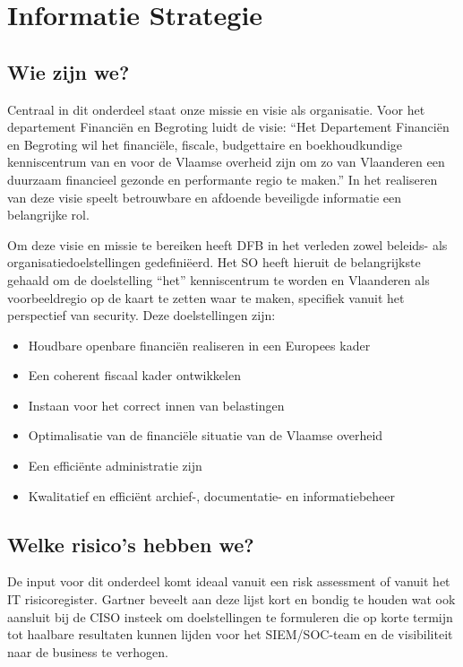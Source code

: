 \documentclass[11pt]{article}
\begin{document}
\section{Informatie Strategie}
\label{sec:orgeaf603a}
\subsection{Wie zijn we?}
\label{sec:orgb6dd55e}
Centraal in dit onderdeel staat onze missie en visie als organisatie. Voor het departement Financiën en Begroting luidt de visie: ``Het Departement Financiën en Begroting wil het 
financiële, fiscale, budgettaire en boekhoudkundige kenniscentrum van en voor de Vlaamse overheid zijn om zo van Vlaanderen een duurzaam financieel gezonde en performante regio te maken.'' In het realiseren van deze visie speelt betrouwbare en afdoende beveiligde informatie een belangrijke rol.

Om deze visie en missie te bereiken heeft DFB in het verleden zowel beleids- als organisatiedoelstellingen gedefiniëerd. Het SO heeft hieruit de belangrijkste gehaald om de doelstelling ``het'' kenniscentrum
te worden en Vlaanderen als voorbeeldregio op de kaart te zetten waar te maken, specifiek vanuit het perspectief van security. Deze doelstellingen zijn:
\begin{itemize}
\item Houdbare openbare financiën realiseren in een Europees kader
\item Een coherent fiscaal kader ontwikkelen
\item Instaan voor het correct innen van belastingen
\item Optimalisatie van de financiële situatie van de Vlaamse overheid
\item Een efficiënte administratie zijn
\item Kwalitatief en efficiënt archief-, documentatie- en informatiebeheer
\end{itemize}

\subsection{Welke risico's hebben we?}
\label{sec:org7663b62}
De input voor dit onderdeel komt ideaal vanuit een risk assessment of vanuit het IT risicoregister. Gartner beveelt aan deze lijst kort en bondig te houden wat ook aansluit bij de CISO insteek om
doelstellingen te formuleren die op korte termijn tot haalbare resultaten kunnen lijden voor het SIEM/SOC-team en de visibiliteit naar de business te verhogen.
\end{document}
